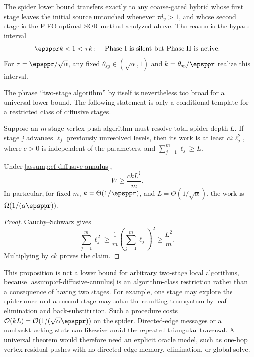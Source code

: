 The spider lower bound transfers exactly to any coarse-gated hybrid whose
first stage leaves the initial source untouched whenever
\(\tau d_v>1\), and whose second stage is the FIFO optimal-SOR method analyzed
above.  The reason is the bypass interval
\begin{equation}
    \epsppr k<1<\tau k:
    \quad
    \text{Phase I is silent but Phase II is active.}
    \label{eq:cf-bypass-interval}
\end{equation}
For \(\tau=\epsppr/\sqrt\alpha\), any fixed
\(\theta_{\mathrm{sp}}\in(\sqrt\alpha,1)\) and \(k=\theta_{\mathrm{sp}}/\epsppr\) realize this interval.

The phrase ``two-stage algorithm'' by itself is nevertheless too broad for a
universal lower bound.  The following statement is only a conditional template
for a restricted class of diffusive stages.

\begin{assumption}
\label{assump:cf-diffusive-annulus}
Suppose an \(m\)-stage vertex-push algorithm must resolve total spider depth
\(L\).  If stage \(j\) advances \(\ell_j\) previously unresolved levels, then
its work is at least \(ck\ell_j^2\), where \(c>0\) is independent of the
parameters, and \(\sum_{j=1}^m\ell_j\geq L\).
\end{assumption}

\begin{proposition}
\label{prop:cf-fixed-stage-barrier}
Under \cref{assump:cf-diffusive-annulus},
\begin{equation}
    W\geq\frac{ckL^2}{m}.
    \label{eq:cf-m-stage-bound}
\end{equation}
In particular, for fixed \(m\),
\(k=\Theta(1/\epsppr)\), and
\(L=\Theta(1/\sqrt\alpha)\), the work is
\(\Omega(1/(\alpha\epsppr))\).
\end{proposition}

\begin{proof}
Cauchy--Schwarz gives
\begin{equation}
    \sum_{j=1}^m\ell_j^2
    \geq\frac{1}{m}\left(\sum_{j=1}^m\ell_j\right)^2
    \geq\frac{L^2}{m}.
    \label{eq:cf-stage-cauchy}
\end{equation}
Multiplying by \(ck\) proves the claim.
\end{proof}

This proposition is not a lower bound for arbitrary two-stage local
algorithms, because \cref{assump:cf-diffusive-annulus} is an algorithm-class
restriction rather than a consequence of having two stages.  For example,
one stage may explore the spider once and a second stage may solve the
resulting tree system by leaf elimination and back-substitution.  Such a
procedure costs \(\mathcal O(kL)=\mathcal O(1/(\sqrt\alpha\epsppr))\) on the
spider.  Directed-edge messages or a nonbacktracking state can likewise avoid
the repeated triangular traversal.  A universal theorem would therefore need
an explicit oracle model, such as one-hop vertex-residual pushes with no
directed-edge memory, elimination, or global solve.

